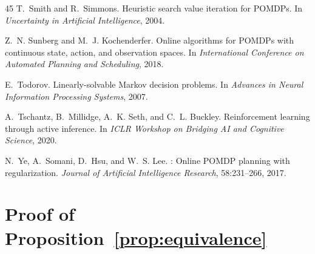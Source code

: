 \documentclass{article}
\begin{document}
{\begin{thebibliography}{45}
T.~Smith and R.~Simmons.
\newblock Heuristic search value iteration for {POMDP}s.
\newblock In \emph{Uncertainty in Artificial Intelligence}, 2004.

Z.~N. Sunberg and M.~J. Kochenderfer.
\newblock Online algorithms for {POMDP}s with continuous state, action, and observation spaces.
\newblock In \emph{International Conference on Automated Planning and Scheduling}, 2018.

E.~Todorov.
\newblock Linearly-solvable {M}arkov decision problems.
\newblock In \emph{Advances in Neural Information Processing Systems}, 2007.

A.~Tschantz, B.~Millidge, A.~K. Seth, and C.~L. Buckley.
\newblock Reinforcement learning through active inference.
\newblock In \emph{ICLR Workshop on Bridging AI and Cognitive Science}, 2020.

N.~Ye, A.~Somani, D.~Hsu, and W.~S. Lee.
: Online {POMDP} planning with regularization.
\newblock \emph{Journal of Artificial Intelligence Research}, 58:231--266, 2017.

\end{thebibliography}
}

\appendix

\section{Proof of Proposition~\ref{prop:equivalence}}
\label{app:proof}
\end{document}
